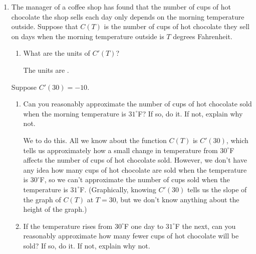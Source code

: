 \documentclass{article}
\theoremstyle{theorem}
\begin{document}
\begin{enumerate}
\begin{enumerate}
  \end{enumerate}

\item  %

  The manager of a coffee shop has found that the number of cups of hot chocolate the shop sells each day only depends on the morning temperature outside. Suppose that $C(T)$ is the number of cups of hot chocolate they sell on days when the morning temperature outside is $T$ degrees Fahrenheit.

  \begin{enumerate}

  \item
    \begin{problem}[\stretch{0.25}]
      What are the units of $C'(T)$?
    \end{problem}

    \begin{solution}
      The units are .  
    \end{solution}

  \end{enumerate}

  Suppose $C'(30) = -10$.

  \begin{enumerate}[resume]

  \item
    \begin{problem}[\vfill]
      Can you reasonably approximate the number of cups of hot chocolate
      sold when the morning temperature is $31^\circ$F?  If so, do it. If
      not, explain why not.
    \end{problem}

    \begin{solution}
      We  to do this. All we know about the function $C(T)$ is $C'(30)$, which tells us approximately how a small change in temperature from $30^\circ$F affects the number of cups of hot chocolate sold. However, we don't have any idea how many cups of hot chocolate are sold when the temperature is $30^\circ$F, so we can't approximate the number of cups sold when the temperature is $31^\circ$F. (Graphically, knowing $C'(30)$ tells us the slope of the graph of $C(T)$ at $T = 30$, but we don't know anything about the height of the graph.)
    \end{solution}

  \item
    \begin{problem}[\vfill]
      If the temperature rises from $30^\circ$F one day to $31^\circ$F the next, can you reasonably approximate how many fewer cups of hot chocolate will be sold? If so, do it. If not, explain why not.
    \end{problem}


\end{enumerate}
\end{enumerate}
\end{document}
